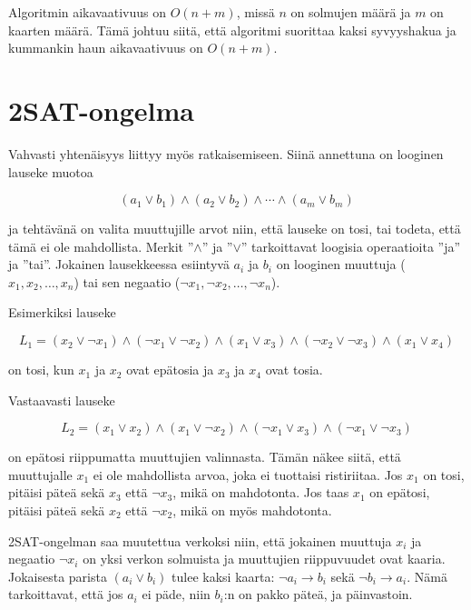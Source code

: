 Algoritmin aikavaativuus on $O(n+m)$,
missä $n$ on solmujen määrä ja $m$ on kaarten määrä.
Tämä johtuu siitä,
että algoritmi suorittaa kaksi syvyyshakua ja
kummankin haun aikavaativuus on $O(n+m)$.

\section{2SAT-ongelma}


Vahvasti yhtenäisyys liittyy myös  ratkaisemiseen.
Siinä annettuna on looginen lauseke muotoa

\[
(a_1 \lor b_1) \land (a_2 \lor b_2) \land \cdots \land (a_m \lor b_m)
\]

ja tehtävänä on valita muuttujille arvot niin,
että lauseke on tosi,
tai todeta, että tämä ei ole mahdollista.
Merkit ''$\land$'' ja ''$\lor$'' tarkoittavat
loogisia operaatioita ''ja'' ja ''tai''.
Jokainen lausekkeessa esiintyvä $a_i$ ja $b_i$ on looginen muuttuja
($x_1,x_2,\ldots,x_n$)
tai sen negaatio ($\lnot x_1, \lnot x_2, \ldots, \lnot x_n$).

Esimerkiksi lauseke

\[
L_1 = (x_2 \lor \lnot x_1) \land
      (\lnot x_1 \lor \lnot x_2) \land
      (x_1 \lor x_3) \land
      (\lnot x_2 \lor \lnot x_3) \land
      (x_1 \lor x_4)
\]

on tosi, kun $x_1$ ja $x_2$ ovat epätosia
ja $x_3$ ja $x_4$ ovat tosia.

Vastaavasti lauseke

\[
L_2 = (x_1 \lor x_2) \land
      (x_1 \lor \lnot x_2) \land
      (\lnot x_1 \lor x_3) \land
      (\lnot x_1 \lor \lnot x_3)
\]

on epätosi riippumatta muuttujien valinnasta.
Tämän näkee siitä, että muuttujalle $x_1$
ei ole mahdollista arvoa, joka ei tuottaisi ristiriitaa.
Jos $x_1$ on tosi, pitäisi päteä sekä $x_3$ että $\lnot x_3$,
mikä on mahdotonta.
Jos taas $x_1$ on epätosi,
pitäisi päteä sekä $x_2$ että $\lnot x_2$,
mikä on myös mahdotonta.

2SAT-ongelman saa muutettua verkoksi niin,
että jokainen muuttuja $x_i$ ja negaatio $\lnot x_i$
on yksi verkon solmuista
ja muuttujien riippuvuudet ovat kaaria.
Jokaisesta parista $(a_i \lor b_i)$ tulee kaksi
kaarta: $\lnot a_i \to b_i$ sekä $\lnot b_i \to a_i$.
Nämä tarkoittavat, että jos $a_i$ ei päde,
niin $b_i$:n on pakko päteä, ja päinvastoin.


